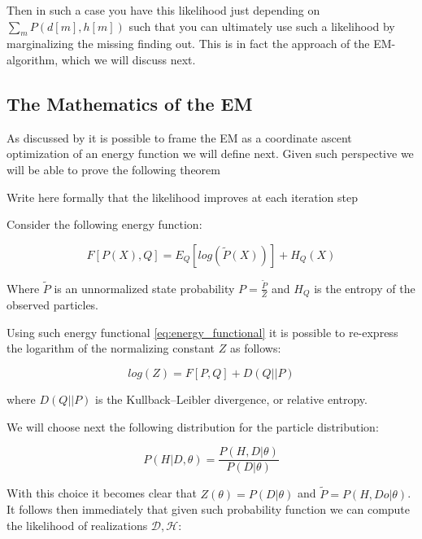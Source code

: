 \documentclass[11pt]{article}
\begin{document}
\begin{article}
Then in such a case you have this likelihood just depending on
\(\sum_m P(d[m], h[m])\) such that you can ultimately use such a
likelihood by marginalizing the missing finding out. This is in
fact the approach of the EM-algorithm, which we will discuss next.

\subsection{The Mathematics of the EM}
\label{math_em}
As discussed by \cite{koller2009probabilistic} it is possible to frame
the EM as a coordinate ascent optimization of an energy function we
will define next. Given such perspective we will be able to prove the
following theorem

\begin{theorem}\label{thm:one}
Write here formally that the likelihood improves at each iteration step
\end{theorem}

Consider the following energy function:

\begin{equation} \label{eq:energy_functional}
F[P(X), Q] = E_Q[log (\tilde{P}(X))] + H_Q (X)
\end{equation}

Where \(\tilde{P}\) is an unnormalized state probability \(P =
   \frac{\tilde{P}}{Z}\) and \(H_Q\) is the entropy of the observed
particles. 

Using such energy functional \ref{eq:energy_functional} it is possible
to re-express the logarithm of the normalizing constant \(Z\) as
follows:

\begin{equation} \label{eq:energy_refurmolation}
log (Z) = F[P, Q] + D (Q||P)
\end{equation}  

where \(D(Q||P)\) is the Kullback–Leibler divergence, or relative
entropy.

We will choose next the following distribution for the particle
distribution:

\begin{equation} \label{eq:particle_distribution}
P (H | D, \theta) =   \frac{P (H, D| \theta)}{P (D| \theta)}
\end{equation}

With this choice it becomes clear that \(Z (\theta) = P (D|
   \theta)\) and \(\tilde{P} = P (H, Do| \theta)\). It
follows then immediately that given such probability function we
can compute the likelihood of realizations \(\mathscr{D}, \mathscr{H}\):


\end{article}
\end{document}
